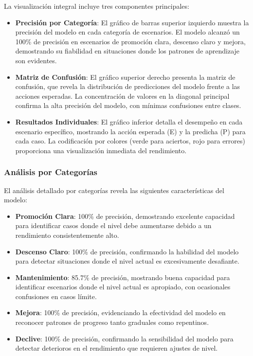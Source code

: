 La visualización integral incluye tres componentes principales:

\begin{itemize}
    \item \textbf{Precisión por Categoría}: El gráfico de barras superior izquierdo muestra la precisión del modelo en cada categoría de escenarios. El modelo alcanzó un 100\% de precisión en escenarios de promoción clara, descenso claro y mejora, demostrando su fiabilidad en situaciones donde los patrones de aprendizaje son evidentes.
    
    \item \textbf{Matriz de Confusión}: El gráfico superior derecho presenta la matriz de confusión, que revela la distribución de predicciones del modelo frente a las acciones esperadas. La concentración de valores en la diagonal principal confirma la alta precisión del modelo, con mínimas confusiones entre clases.
    
    \item \textbf{Resultados Individuales}: El gráfico inferior detalla el desempeño en cada escenario específico, mostrando la acción esperada (E) y la predicha (P) para cada caso. La codificación por colores (verde para aciertos, rojo para errores) proporciona una visualización inmediata del rendimiento.
\end{itemize}

\subsubsection{Análisis por Categorías}

El análisis detallado por categorías revela las siguientes características del modelo:

\begin{itemize}
    \item \textbf{Promoción Clara}: 100\% de precisión, demostrando excelente capacidad para identificar casos donde el nivel debe aumentarse debido a un rendimiento consistentemente alto.
    
    \item \textbf{Descenso Claro}: 100\% de precisión, confirmando la habilidad del modelo para detectar situaciones donde el nivel actual es excesivamente desafiante.
    
    \item \textbf{Mantenimiento}: 85.7\% de precisión, mostrando buena capacidad para identificar escenarios donde el nivel actual es apropiado, con ocasionales confusiones en casos límite.
    
    \item \textbf{Mejora}: 100\% de precisión, evidenciando la efectividad del modelo en reconocer patrones de progreso tanto graduales como repentinos.
    
    \item \textbf{Declive}: 100\% de precisión, confirmando la sensibilidad del modelo para detectar deterioros en el rendimiento que requieren ajustes de nivel.
\end{itemize}

